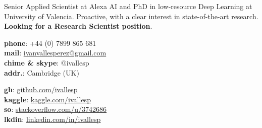 \documentclass{resume} %
\begin{document}
\noindent

\printname
\vspace{5pt}

\begin{minipage}[t]{.38\textwidth}
	\raggedright


Senior Applied Scientist at Alexa AI and PhD in low-resource Deep Learning at University of Valencia. Proactive, with a clear interest in state-of-the-art research.\\ 
\textbf{Looking for a Research Scientist position}.

\end{minipage}\hspace{.05\textwidth}
\begin{minipage}[t]{.27\textwidth}
	\raggedright
	{\textbf{phone}: +44 (0) 7899 865 681 \\
	\textbf{mail}: \href{mailto:ivanvallesperez@gmail.com}{ivanvallesperez@gmail.com}\\
	\textbf{chime \& skype}: @ivallesp \\
	\textbf{addr.}: Cambridge (UK)
}
\end{minipage}\hspace{.03\textwidth}
\begin{minipage}[t]{.27\textwidth}
	\raggedright
	{ \textbf{gh}: \href{https://www.github.com/ivallesp}{github.com/ivallesp}  \\
	  \textbf{kaggle}: \href{https://www.kaggle.com/ivallesp}{kaggle.com/ivallesp}  \\
	  \textbf{so}: \href{https://stackoverflow.com/users/3742686/ivallesp}{stackoverflow.com/u/3742686} \\
	  \textbf{lkdin}: \href{https://www.linkedin.com/in/ivallesp}{linkedin.com/in/ivallesp}
	}
\end{minipage}


\end{document}
